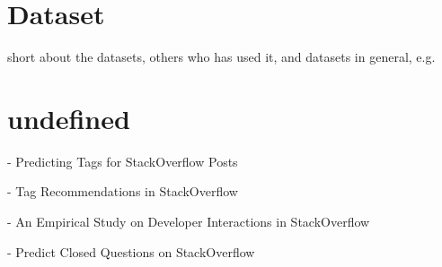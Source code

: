 \begin{comment}
\end{itemize}
Experimental results show that \gls{svm}s consistently achieve good performance on text categorization tasks, outperforming existing methods substantially and significantly. 
With their ability to generalize well in high dimensional feature spaces, \gls{svm}s eliminate the need for feature selection, making the application of text categorization considerably easier.
Another advantage of \gls{svm}s over the conventional methods is their robustness. 
\gls{svm}s show good performance in all experiments, avoiding catastrophic failure, as observed with the conventional methods on some tasks. 
Furthermore, \gls{svm}s do not require any parameter tuning, since they can find good parameter settings automatically. 
All this makes \gls{svm}s a very promising and easy-to-use method for learning text classifiers from examples.
\cite{Joachims1998}
\end{comment}


\section{Dataset}
\label{sec:dataset}
short about the datasets, others who has used it, and datasets in general, e.g. 
\cite{Klein2016,SpaceMachine.net2016,Wissner-Gross2016}









\section{undefined}
\label{sec:undefined}

\textcite{Stanley2013} - Predicting Tags for StackOverflow Posts

\textcite{Short2014} - Tag Recommendations in StackOverflow

\textcite{Wang2013} - An Empirical Study on Developer Interactions in StackOverflow

\textcite{Lezina2013} - Predict Closed Questions on StackOverflow
